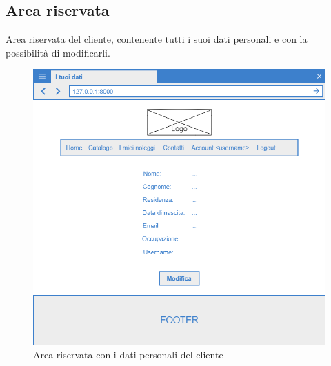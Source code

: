 \documentclass[12pt,a4paperS]{report}
\begin{document}
\begin{normalsize}
			\subsection{Area riservata}
				Area riservata del cliente, contenente tutti i suoi dati personali e con la possibilità di modificarli.
				\begin{figure}[H]
					\centering
					\includegraphics[width=1\textwidth, height=1\textheight, keepaspectratio]{Mockup/Area_riservata.png}
					\caption{Area riservata con i dati personali del cliente}
				\end{figure}
			

\end{normalsize}
\end{document}

